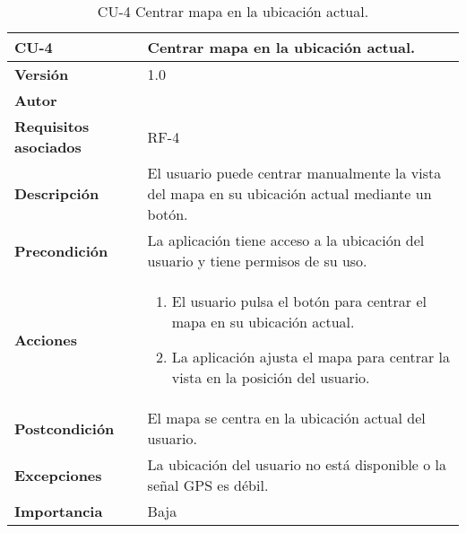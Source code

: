 \begin{table}[p]
	\centering
	\begin{tabularx}{\linewidth}{ p{} p{} }
		\toprule
		\textbf{CU-4}    & \textbf{Centrar mapa en la ubicación actual.}\\
		\toprule
		\textbf{Versión}              & 1.0    \\
		\textbf{Autor}                & \autor \\
		\textbf{Requisitos asociados} & RF-4 \\
		\textbf{Descripción}          & El usuario puede centrar manualmente la vista del mapa en su ubicación actual mediante un botón. \\
		\textbf{Precondición}         & La aplicación tiene acceso a la ubicación del usuario y tiene permisos de su uso. \\
		\textbf{Acciones}             &
		\begin{enumerate}
			\def\labelenumi{\arabic{enumi}.}
			\tightlist
			\item El usuario pulsa el botón para centrar el mapa en su ubicación actual.
			\item La aplicación ajusta el mapa para centrar la vista en la posición del usuario.
		\end{enumerate}\\
		\textbf{Postcondición}        & El mapa se centra en la ubicación actual del usuario. \\
		\textbf{Excepciones}          & La ubicación del usuario no está disponible o la señal GPS es débil. \\
		\textbf{Importancia}          & Baja \\
		\bottomrule
	\end{tabularx}
	\caption{CU-4 Centrar mapa en la ubicación actual.}
\end{table}

